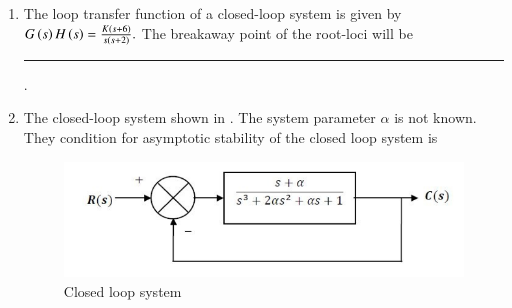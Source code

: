 \documentclass[journal,12pt,onecolumn]{IEEEtran}
\theoremstyle{remark}
\begin{document}
\begin{enumerate}
\item The loop transfer function of a closed-loop system is given by $G \left(s\right)H \left(s\right) = \frac{K(s+6)}{s(s+2)}.$ 
The breakaway point of the root-loci will be \rule{1.5cm}{0.4pt}. \par \hfill{}

\item The closed-loop system shown in . The system parameter $\alpha$ is not known. They condition for asymptotic stability of the closed loop system is \par \hfill{}
\begin{figure}[H]
    \centering
    \includegraphics[width=0.6\columnwidth]{Figs/Q-38.png}
    \caption{Closed loop system}
    \label{fig:placeholder_16}
\end{figure}
\begin{enumerate}
\end{enumerate}


\end{enumerate}
\end{document}
